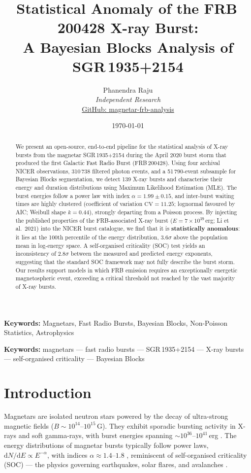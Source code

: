 \documentclass[12pt]{article}
\title{\textbf{Statistical Anomaly of the FRB\,200428 X-ray Burst:\\
A Bayesian Blocks Analysis of SGR\,1935+2154}}
\author{
    Phanendra Raju\\
    \small \textit{Independent Research}\\
    \small \href{https://github.com/}{GitHub: magnetar-frb-analysis}
}
\date{\today}
\begin{document}
\maketitle

\textbf{Keywords:} Magnetars, Fast Radio Bursts, Bayesian Blocks, Non-Poisson Statistics, Astrophysics

\begin{abstract}
We present an open-source, end-to-end pipeline for the statistical analysis
of X-ray bursts from the magnetar SGR\,1935+2154 during the April 2020
burst storm that produced the first Galactic Fast Radio Burst (FRB\,200428).
Using four archival NICER observations, 310\,738 filtered photon events,
and a 51\,790-event subsample for Bayesian Blocks segmentation, we detect
139 X-ray bursts and characterise their energy and duration distributions
using Maximum Likelihood Estimation (MLE). The burst
energies follow a power law with index $\alpha = 1.99 \pm 0.15$, and
inter-burst waiting times are highly clustered (coefficient of variation
$\mathrm{CV} = 11.25$; lognormal favoured by AIC; Weibull shape
$k = 0.44$), strongly departing from a Poisson process. By injecting the published properties of the
FRB-associated X-ray burst ($E = 7 \times 10^{39}$\,erg; Li et al.\ 2021)
into the NICER burst catalogue, we find that it is \textbf{statistically
anomalous}: it lies at the 100th percentile of the energy distribution,
$3.6\sigma$ above the population mean in log-energy space. A
self-organised criticality (SOC) test yields an inconsistency of
$2.8\sigma$ between the measured and predicted energy exponents, suggesting
that the standard SOC framework may not fully describe the burst storm.
Our results support models in which FRB emission requires an exceptionally
energetic magnetospheric event, exceeding a critical threshold not reached
by the vast majority of X-ray bursts.
\end{abstract}

\medskip
\noindent\textbf{Keywords:} magnetars --- fast radio bursts --- SGR\,1935+2154
--- X-ray bursts --- self-organised criticality --- Bayesian Blocks

\section{Introduction}\label{sec:intro}

Magnetars are isolated neutron stars powered by the decay of ultra-strong
magnetic fields ($B \sim 10^{14}$--$10^{15}$\,G). They exhibit sporadic
bursting activity in X-rays and soft gamma-rays, with burst energies
spanning $\sim\!10^{36}$--$10^{41}$\,erg \citep{kaspi2017}. The energy
distributions of magnetar bursts typically follow power laws,
$\mathrm{d}N/\mathrm{d}E \propto E^{-\alpha}$, with indices
$\alpha \approx 1.4$--$1.8$ \citep{gogus1999, gogus2000}, reminiscent of
self-organised criticality (SOC) --- the physics governing earthquakes,
solar flares, and avalanches \citep{bak1987, aschwanden2016}.
\end{document}
